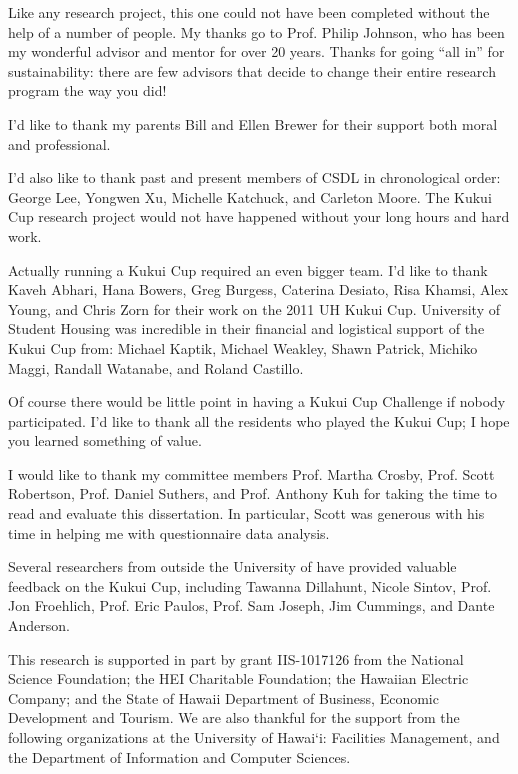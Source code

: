 \begin{acknowledgments}

Like any research project, this one could not have been completed without the help of a number of people. My thanks go to Prof. Philip Johnson, who has been my wonderful advisor and mentor for over 20 years. Thanks for going ``all in'' for sustainability: there are few advisors that decide to change their entire research program the way you did!
  
I'd like to thank my parents Bill and Ellen Brewer for their support both moral and professional.

I'd also like to thank past and present members of CSDL in chronological order: George Lee, Yongwen Xu, Michelle Kat\-chuck, and Carleton Moore. The Kukui Cup research project would not have happened without your long hours and hard work.

Actually running a Kukui Cup required an even bigger team. I'd like to thank Kaveh Abhari, Hana Bowers, Greg Burgess, Caterina Desiato, Risa Khamsi, Alex Young, and Chris Zorn for their work on the 2011 UH Kukui Cup. University of \Hawaii Student Housing was incredible in their financial and logistical support of the Kukui Cup from: Michael Kaptik, Michael Weakley, Shawn Patrick, Michiko Maggi, Randall Watanabe, and Roland Castillo.

Of course there would be little point in having a Kukui Cup Challenge if nobody participated. I'd like to thank all the residents who played the Kukui Cup; I hope you learned something of value.

I would like to thank my committee members Prof. Martha Crosby, Prof. Scott Robertson, Prof. Daniel Suthers, and Prof. Anthony Kuh for taking the time to read and evaluate this dissertation. In particular, Scott was generous with his time in helping me with questionnaire data analysis.

Several researchers from outside the University of \Hawaii have provided valuable feedback on the Kukui Cup, including Tawanna Dillahunt, Nicole Sintov, Prof. Jon Froehlich, Prof. Eric Paulos, Prof. Sam Joseph, Jim Cummings, and Dante Anderson.

This research is supported in part by grant IIS-1017126 from the National Science Foundation; the HEI Charitable Foundation; the Hawaiian Electric Company; and the State of Hawaii Department of Business, Economic Development and Tourism. We are also thankful for the support from the following organizations at the University of Hawai`i: Facilities Management, and the Department of Information and Computer Sciences. 


\end{acknowledgments}
